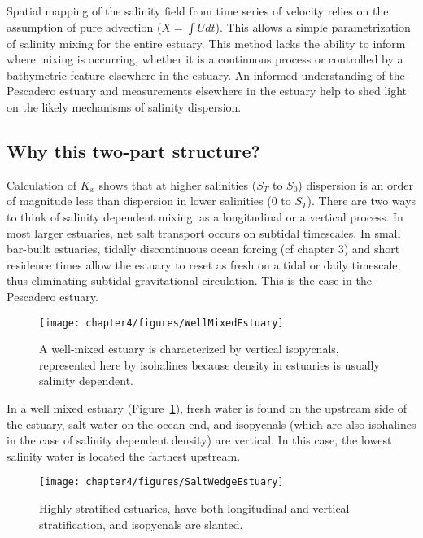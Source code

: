 Spatial mapping of the salinity field from time series of velocity relies on the assumption of pure advection ($X = \int{U}dt$). This allows a simple parametrization of salinity mixing for the entire estuary. This method lacks the ability to inform where mixing is occurring, whether it is a continuous process or controlled by a bathymetric feature elsewhere in the estuary. An informed understanding of the Pescadero estuary and measurements elsewhere in the estuary help to shed light on the likely mechanisms of salinity dispersion.

\subsection{Why this two-part structure?}

Calculation of $K_x$ shows that at higher salinities ($S_T$ to $S_0$) dispersion is an order of magnitude less than dispersion in lower salinities (0 to $S_T$). There are two ways to think of salinity dependent mixing: as a longitudinal or a vertical process. In most larger estuaries, net salt transport occurs on subtidal timescales. In small bar-built estuaries, tidally discontinuous ocean forcing (cf chapter 3) and short residence times allow the estuary to reset as fresh on a tidal or daily timescale, thus eliminating subtidal gravitational circulation. This is the case in the Pescadero estuary.

\begin{figure}[h]
\centering
	\texttt{[image: chapter4/figures/WellMixedEstuary]}
	\caption{A well-mixed estuary is characterized by vertical isopycnals, represented here by isohalines because density in estuaries is usually salinity dependent.} \label{fig:WellMixedEstuary}
\end{figure}

In a well mixed estuary (Figure~\ref{fig:WellMixedEstuary}), fresh water is found on the upstream side of the estuary, salt water on the ocean end, and isopycnals (which are also isohalines in the case of salinity dependent density) are vertical. In this case, the lowest salinity water is located the farthest upstream. 

\begin{figure}[h]
\centering
	\texttt{[image: chapter4/figures/SaltWedgeEstuary]}
	\caption{Highly stratified estuaries, have both longitudinal and vertical stratification, and isopycnals are slanted.} \label{fig:SaltWedgeEstuary}
\end{figure}

